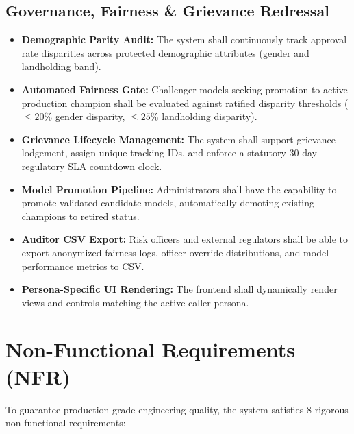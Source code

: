 \subsection{Governance, Fairness \& Grievance Redressal}
\begin{itemize}[leftmargin=2em, label=\textbf{FR-\arabic*.}]
  \setcounter{enumi}{12}
  \item \textbf{Demographic Parity Audit:} The system shall continuously track approval rate disparities across protected demographic attributes (gender and landholding band).
  \item \textbf{Automated Fairness Gate:} Challenger models seeking promotion to active production champion shall be evaluated against ratified disparity thresholds ($\le 20\%$ gender disparity, $\le 25\%$ landholding disparity).
  \item \textbf{Grievance Lifecycle Management:} The system shall support grievance lodgement, assign unique tracking IDs, and enforce a statutory 30-day regulatory SLA countdown clock.
  \item \textbf{Model Promotion Pipeline:} Administrators shall have the capability to promote validated candidate models, automatically demoting existing champions to retired status.
  \item \textbf{Auditor CSV Export:} Risk officers and external regulators shall be able to export anonymized fairness logs, officer override distributions, and model performance metrics to CSV.
  \item \textbf{Persona-Specific UI Rendering:} The frontend shall dynamically render views and controls matching the active caller persona.
\end{itemize}

\section{Non-Functional Requirements (NFR)}
To guarantee production-grade engineering quality, the system satisfies 8 rigorous non-functional requirements:

